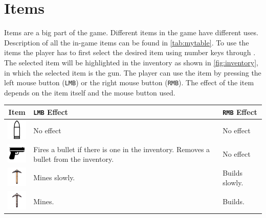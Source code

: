 \section{Items}
Items are a big part of the game.
Different items in the game have different uses.
Description of all the in-game items can be found in \autoref{tab:mytable}.
To use the items the player has to first select the desired item using number keys  through .
The selected item will be highlighted in the inventory as shown in \autoref{fig:inventory}, in which the selected item is the gun.
The player can use the item by pressing the left mouse button (\texttt{LMB}) or the right mouse button (\texttt{RMB}).
The effect of the item depends on the item itself and the mouse button used.

\begin{table}[h]
    \centering
    \begin{tabular}{|c|p{5cm}|p{5cm}|}
        \hline
        Item                                                                         & \texttt{LMB} Effect                                                                   & \texttt{RMB} Effect \\
        \hline
        \includegraphics[width=1cm]{chapters/user_manual/resources/bullet.png}       & No effect                                                                             & No effect           \\
        \hline
        \includegraphics[width=1cm]{chapters/user_manual/resources/pistol.png}       & Fires a bullet if there is one in the inventory. Removes a bullet from the inventory. & No effect           \\
        \hline
        \includegraphics[width=1cm]{chapters/user_manual/resources/pickaxe-slow.png} & Mines slowly.                                                                         & Builds slowly.      \\
        \hline
        \includegraphics[width=1cm]{chapters/user_manual/resources/pickaxe-mid.png}  & Mines.                                                                                & Builds.             \\

\end{tabular}
\end{table}

